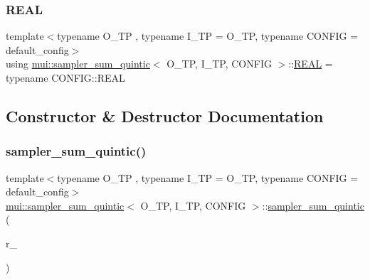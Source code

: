 \mbox{\label{classmui_1_1sampler__sum__quintic_a9cbbc0e8f2384abe39ec2339229b64b6}} 
\subsubsection{\texorpdfstring{R\+E\+AL}{REAL}}
{\footnotesize\ttfamily template$<$typename O\+\_\+\+TP , typename I\+\_\+\+TP  = O\+\_\+\+TP, typename C\+O\+N\+F\+IG  = default\+\_\+config$>$ \\
using \hyperlink{classmui_1_1sampler__sum__quintic}{mui\+::sampler\+\_\+sum\+\_\+quintic}$<$ O\+\_\+\+TP, I\+\_\+\+TP, C\+O\+N\+F\+IG $>$\+::\hyperlink{classmui_1_1sampler__sum__quintic_a9cbbc0e8f2384abe39ec2339229b64b6}{R\+E\+AL} =  typename C\+O\+N\+F\+I\+G\+::\+R\+E\+AL}



\subsection{Constructor \& Destructor Documentation}
\mbox{\label{classmui_1_1sampler__sum__quintic_a759cd2acccbbe273bbd7bb65016f68fb}} 
\subsubsection{\texorpdfstring{sampler\+\_\+sum\+\_\+quintic()}{sampler\_sum\_quintic()}}
{\footnotesize\ttfamily template$<$typename O\+\_\+\+TP , typename I\+\_\+\+TP  = O\+\_\+\+TP, typename C\+O\+N\+F\+IG  = default\+\_\+config$>$ \\
\hyperlink{classmui_1_1sampler__sum__quintic}{mui\+::sampler\+\_\+sum\+\_\+quintic}$<$ O\+\_\+\+TP, I\+\_\+\+TP, C\+O\+N\+F\+IG $>$\+::\hyperlink{classmui_1_1sampler__sum__quintic}{sampler\+\_\+sum\+\_\+quintic} (\begin{DoxyParamCaption}\item[{\hyperlink{classmui_1_1sampler__sum__quintic_a9cbbc0e8f2384abe39ec2339229b64b6}{R\+E\+AL}}]{r\+\_\+ }\end{DoxyParamCaption})\hspace{0.3cm}{\ttfamily [inline]}}



